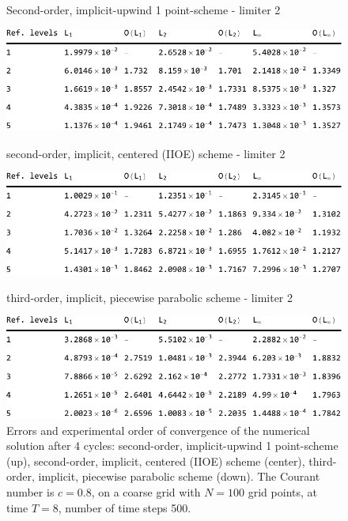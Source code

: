 \documentclass[../thesis.tex]{subfiles}
\begin{document}
\begin{figure}[H]
	\centering
    \caption*{Second-order, implicit-upwind 1 point-scheme - limiter 2}
	\includegraphics[width=\textwidth]{../tab/tab-1point-c0p8-T8-limit2-smooth.pdf}
    \caption*{second-order, implicit, centered (IIOE) scheme - limiter 2}
	\includegraphics[width=\textwidth]{../tab/tab-iioe-c0p8-T8-limit2-smooth.pdf}
    \caption*{third-order, implicit, piecewise parabolic scheme - limiter 2}
	\includegraphics[width=\textwidth]{../tab/tab-implicit-ppm-c0p8-T8-limit2-smooth.pdf}
	\caption{Errors and experimental order of convergence of the numerical solution after 4 cycles: second-order, implicit-upwind 1 point-scheme (up), second-order, implicit, centered (IIOE) scheme (center), third-order, implicit, piecewise parabolic scheme (down). The Courant number is \(c = 0.8\), on a coarse grid with \(N = 100\) grid points, at time \(T = 8\), number of time steps 500.}
	\label{tab:c0p8-T8-limit2-smooth}
\end{figure}
\end{document}

